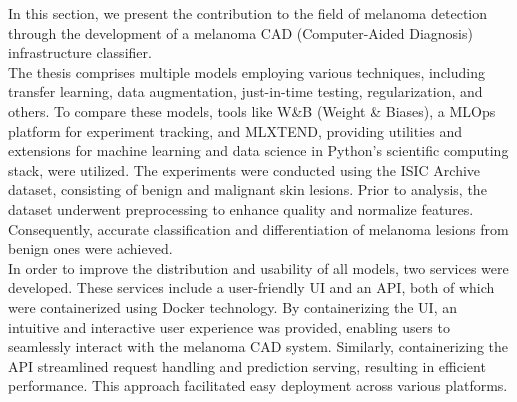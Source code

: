In this section, we present the contribution to the field of melanoma detection through the development of a melanoma CAD (Computer-Aided Diagnosis) infrastructure classifier. \\

The thesis comprises multiple models employing various techniques, including transfer learning, data augmentation, just-in-time testing, regularization, and others. To compare these models, tools like W\&B (Weight \& Biases), a MLOps platform for experiment tracking, and MLXTEND, providing utilities and extensions for machine learning and data science in Python's scientific computing stack, were utilized. The experiments were conducted using the ISIC Archive dataset, consisting of benign and malignant skin lesions. Prior to analysis, the dataset underwent preprocessing to enhance quality and normalize features. Consequently, accurate classification and differentiation of melanoma lesions from benign ones were achieved. \\

In order to improve the distribution and usability of all models, two services were developed. These services include a user-friendly UI and an API, both of which were containerized using Docker technology. By containerizing the UI, an intuitive and interactive user experience was provided, enabling users to seamlessly interact with the melanoma CAD system. Similarly, containerizing the API streamlined request handling and prediction serving, resulting in efficient performance. This approach facilitated easy deployment across various platforms.
